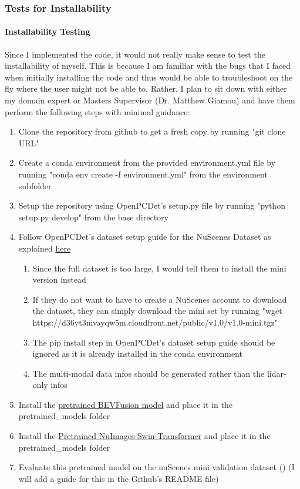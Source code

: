 \documentclass[12pt, titlepage]{article}
\begin{document}
\subsubsection{Tests for Installability}

\paragraph{Installability Testing}

Since I implemented the code, it would not really make sense to test the installability of \progname{} myself.
This is because I am familiar with the bugs that I faced when initially installing the code and thus would be able to 
troubleshoot on the fly where the user might not be able to. Rather, I plan to sit down with either my domain expert 
or Masters Supervisor (Dr. Matthew Giamou) and have them perform the following steps with minimal guidance:

\begin{enumerate}
  \item Clone the repository from github to get a fresh copy by running "git clone URL"
  \item Create a conda environment from the provided environment.yml file by running "conda env create -f environment.yml" from the environment subfolder
  \item Setup the repository using OpenPCDet's setup.py file by running "python setup.py develop" from the base directory
  \item Follow OpenPCDet's dataset setup guide for the NuScenes Dataset as explained \href{https://github.com/open-mmlab/OpenPCDet/blob/master/docs/GETTING_STARTED.md}{here}
  \begin{enumerate}
    \item Since the full dataset is too large, I would tell them to install the mini version instead
    \item If they do not want to have to create a NuScenes account to download the dataset, they can simply download the mini set by running "wget https://d36yt3mvayqw5m.cloudfront.net/public/v1.0/v1.0-mini.tgz"
    \item The pip install step in OpenPCDet's dataset setup guide should be ignored as it is already installed in the conda environment
    \item The multi-modal data infos should be generated rather than the lidar-only infos
  \end{enumerate}
  \item Install the \href{https://drive.google.com/file/d/1X50b-8immqlqD8VPAUkSKI0Ls-4k37g9/view}{pretrained BEVFusion model} and place it in the pretrained\_models folder
  \item Install the \href{https://drive.google.com/file/d/1v74WCt4_5ubjO7PciA5T0xhQc9bz_jZu/view}{Pretrained NuImages Swin-Transformer} and place it in the pretrained\_models folder
  \item Evaluate this pretrained model on the nuScenes mini validation dataset (\cite{caesar2020nuscenes}) (I will add a guide for this in the Github's README file)
\end{enumerate}
\end{document}
